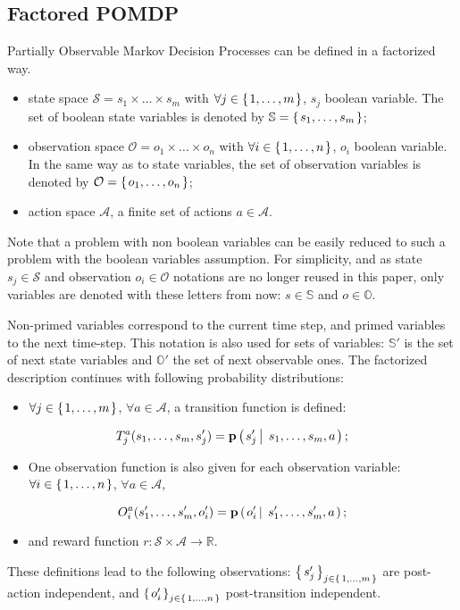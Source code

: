 \subsection{Factored POMDP}
Partially Observable Markov Decision Processes 
can be defined in a factorized way.
\begin{itemize}
\item state space $\mathcal{S} = s_1 \times \ldots \times s_m$ with 
$\forall j \in \left\{ \left.  1, \ldots, m \right. \right\}$, $s_j$ boolean variable. 
The set of boolean state variables is denoted by 
$\mathbb{S} = \left\{ \left.  s_1, \ldots, s_m  \right. \right\}$;
\item observation space $\mathcal{O} = o_1 \times \ldots \times o_n$ 
with $\forall i \in \left\{ \left.  1, \ldots, n \right. \right\}$, $o_i$ boolean variable.
In the same way as to state variables, the set of observation variables is denoted by 
$\mathcal{O}=\left\{ \left.  o_1, \ldots, o_n  \right. \right\}$;
\item action space $\mathcal{A}$, a finite set of actions $a \in \mathcal{A}$.
\end{itemize}
Note that a problem with non boolean variables can be easily reduced to such a problem
with the boolean variables assumption. 
For simplicity, and as state $s_j \in \mathcal{S}$ and observation $o_i \in \mathcal{O}$ notations are no longer reused 
in this paper, only variables are denoted with these letters from now: $s \in \mathbb{S}$ and $o \in \mathbb{O}$.
 
Non-primed variables correspond to the
current time step, and primed variables to the next time-step.
This notation is also used for sets of variables: $\mathbb{S}'$ is the set
of next state variables and $\mathbb{O}'$ the set of next observable ones.
The factorized description continues with following probability distributions:
\begin{itemize}
\item $\forall j \in \left\{ \left. 1, \ldots, m \right. \right\}$, $\forall a \in \mathcal{A}$, a transition function is defined:
\end{itemize} 
\[ T_j^a(s_1, \ldots, s_m, s'_j) = \textbf{p} \left( \left.  s'_j \, \right| \left. \, s_1,\ldots,s_m, a \right. \right); \]
\begin{itemize}
\item One observation function is also given for each observation variable: $\forall i \in \left\{ \left. 1, \ldots, n \right. \right\}$, $\forall a \in \mathcal{A}$,
\end{itemize}
\[ O_i^a(s_1', \ldots, s_m', o'_i) = \textbf{p} \left( \left.  o'_i \, \right| \left. \, s_1',\ldots,s_m', a \right. \right); \]
\begin{itemize}
\item and reward function $r: \mathcal{S} \times \mathcal{A} \rightarrow \mathbb{R}$. 
\end{itemize}
These definitions lead to the following observations: $\left\{ \left.  s'_j  \right. \right\}_{j \in \left\{ \left. 1, \ldots, m \right. \right\}}$ 
are post-action independent, and $\left\{ \left.  o'_i  \right. \right\}_{j \in \left\{ \left. 1, \ldots, n \right. \right\}}$ post-transition independent. 
